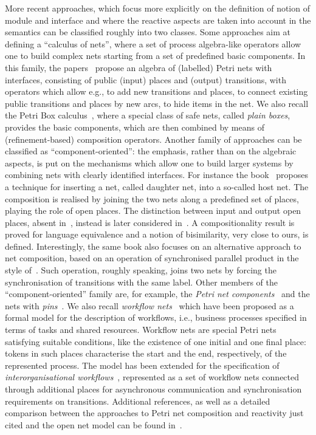 \documentclass{LMCS}
\begin{document}
More recent approaches, which focus more explicitly on the definition
of notion of module and interface and where the reactive aspects are
taken into account in the semantics can be classified roughly into two
classes.
Some approaches aim at defining a ``calculus of nets'', where a set
of process algebra-like operators allow one to build complex nets
starting from a set of predefined basic components. In this family,
the papers~\cite{NPS:CBCP,PW:UATC} propose an algebra of (labelled)
Petri nets with interfaces, consisting of public (input) places and
(output) transitions, with operators which allow e.g., to add new
transitions and places, to connect existing public transitions and
places by new arcs, to hide items in the net.
We also recall the Petri Box
calculus~\cite{BDH:BCCA,KEB:OSPB,KB:ODSBC}, where a special class of
safe nets, called \emph{plain boxes}, provides the basic components,
which are then combined by means of (refinement-based) composition
operators.
Another family of approaches can be classified as
``component-oriented'': the emphasis, rather than on the algebraic
aspects, is put on the mechanisms which allow one to build larger
systems by combining nets with clearly identified interfaces.
For instance the book~\cite{v:modular-petri} proposes a technique for
inserting a net, called daughter net, into a so-called host net. The
composition is realised by joining the two nets along a predefined set
of places, playing the role of open places. The distinction between
input and output open places, absent in~\cite{v:modular-petri},
instead is later considered in~\cite{v:efficiency-asynchronous}. A
compositionality result is proved for language equivalence and a
notion of bisimilarity, very close to ours, is defined.
Interestingly, the same book also focuses on an alternative approach to
net composition, based on an operation of synchronised parallel
product in the style of~\cite{Win:PNAM}. Such operation, roughly
speaking, joins two nets by forcing the synchronisation of transitions
with the same label.
Other members of the ``component-oriented'' family are, for example,
the \emph{Petri net components}~\cite{Kin:CPOS} and the nets with
\emph{pins}~\cite{Bas:phd}.
We also recall \emph{workflow nets}~\cite{Aal:APNW} which have been
proposed as a formal model for the description of workflows,
i.e., business processes specified in terms of tasks and shared
resources. Workflow nets are special Petri nets satisfying suitable
conditions, like the existence of one initial and one final place:
tokens in such places characterise the start and the end,
respectively, of the represented process. The model has been extended
for the specification of \emph{interorganisational
  workflows}~\cite{Aal:IWAB}, represented as a set of workflow nets
connected through additional places for asynchronous communication and
synchronisation requirements on transitions.
Additional references, as well as a detailed comparison between the
approaches to Petri net composition and reactivity just cited and the
open net model can be found in~\cite{BCEH:CSOP}.
\end{document}
